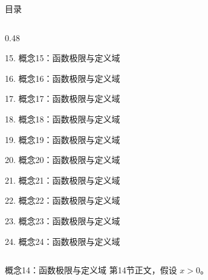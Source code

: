 \documentclass[aspectratio=169,10pt,fontset=fandol]{ctexbeamer}
\begin{document}
\begin{frame}[t,fragile]{目录}
\begin{columns}[T,onlytextwidth]
\begin{column}{0.48\textwidth}
{\color{gray!40}\small 15. 概念15：函数极限与定义域\par}\vspace{0.22em}
{\color{gray!40}\small 16. 概念16：函数极限与定义域\par}\vspace{0.22em}
{\color{gray!40}\small 17. 概念17：函数极限与定义域\par}\vspace{0.22em}
{\color{gray!40}\small 18. 概念18：函数极限与定义域\par}\vspace{0.22em}
{\color{gray!40}\small 19. 概念19：函数极限与定义域\par}\vspace{0.22em}
{\color{gray!40}\small 20. 概念20：函数极限与定义域\par}\vspace{0.22em}
{\color{gray!40}\small 21. 概念21：函数极限与定义域\par}\vspace{0.22em}
{\color{gray!40}\small 22. 概念22：函数极限与定义域\par}\vspace{0.22em}
{\color{gray!40}\small 23. 概念23：函数极限与定义域\par}\vspace{0.22em}
{\color{gray!40}\small 24. 概念24：函数极限与定义域\par}\vspace{0.22em}
\end{column}
\end{columns}
\end{frame}
\begin{frame}[t,fragile]{概念14：函数极限与定义域}
\normalsize
{\normalsize
第14节正文，假设 $x>0$。
}
\end{frame}
\end{document}
